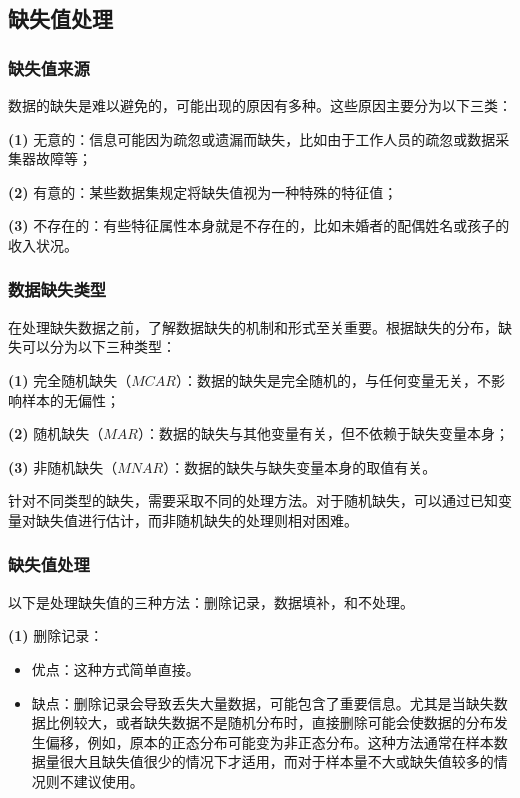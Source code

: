 \documentclass[withoutpreface,bwprint]{cumcmthesis}
\begin{document}
\subsection{缺失值处理}

\subsubsection{缺失值来源}

数据的缺失是难以避免的，可能出现的原因有多种。这些原因主要分为以下三类：

\textbf{(1)} 无意的：信息可能因为疏忽或遗漏而缺失，比如由于工作人员的疏忽或数据采集器故障等；

\textbf{(2)} 有意的：某些数据集规定将缺失值视为一种特殊的特征值；

\textbf{(3)} 不存在的：有些特征属性本身就是不存在的，比如未婚者的配偶姓名或孩子的收入状况。

\subsubsection{数据缺失类型}

在处理缺失数据之前，了解数据缺失的机制和形式至关重要。根据缺失的分布，缺失可以分为以下三种类型：

\textbf{(1)} 完全随机缺失（\(MCAR\)）：数据的缺失是完全随机的，与任何变量无关，不影响样本的无偏性；

\textbf{(2)} 随机缺失（\(MAR\)）：数据的缺失与其他变量有关，但不依赖于缺失变量本身；

\textbf{(3)} 非随机缺失（\(MNAR\)）：数据的缺失与缺失变量本身的取值有关。

针对不同类型的缺失，需要采取不同的处理方法。对于随机缺失，可以通过已知变量对缺失值进行估计，而非随机缺失的处理则相对困难。

\subsubsection{缺失值处理}

以下是处理缺失值的三种方法：删除记录，数据填补，和不处理。

\textbf{(1)} 删除记录：

\begin{itemize}
    \item 优点：这种方式简单直接。
    \item 缺点：删除记录会导致丢失大量数据，可能包含了重要信息。尤其是当缺失数据比例较大，或者缺失数据不是随机分布时，直接删除可能会使数据的分布发生偏移，例如，原本的正态分布可能变为非正态分布。这种方法通常在样本数据量很大且缺失值很少的情况下才适用，而对于样本量不大或缺失值较多的情况则不建议使用。
\end{itemize}
\end{document}

